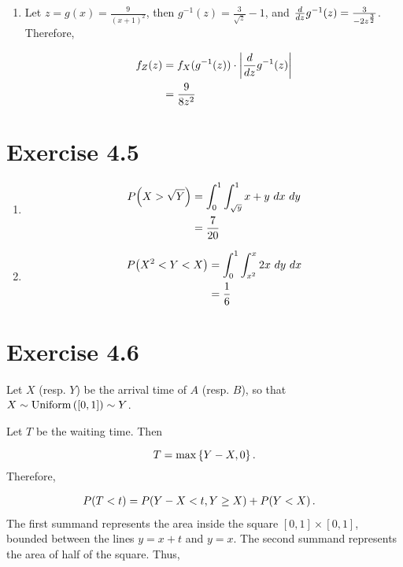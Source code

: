 \documentclass[12pt,letterpaper,reqno]{amsart}
\numberwithin{equation}{subsection}
\begin{document}
\begin{enumerate}[label=(\alph*),leftmargin=*]
    \item Let $z = g(x) = \frac{9}{(x+1)^2}$, then $g^{-1}(z) = \frac{3}{\sqrt{z}}-1$, and $\Dif{}{z} g^{-1}(z) = \frac{3}{-2 z^{\frac{3}{2}}}$. Therefore,
    
    \begin{align*}
        f_Z(z) &= f_X(g^{-1}(z)) \cdot \Abs{\Dif{}{z} g^{-1}(z)} \\
               &= \frac{9}{8z^2}
    \end{align*}
\end{enumerate}

\newpage
\section{Exercise 4.5}

\begin{enumerate}[label=(\alph*),leftmargin=*]
    \item 
    
    \begin{align*}
        \fun{P}{X > \sqrt{Y}} &= \myint{\myint{x+y}{x}{\sqrt{y}}{1}}{y}{0}{1} \\
        &= \frac{7}{20}
    \end{align*}
    
    \item
    
    \begin{align*}
        \fun{P}{X^2 < Y < X} &= \myint{\myint{2x}{y}{x^2}{x}}{x}{0}{1} \\
        &= \frac{1}{6}
    \end{align*}
\end{enumerate}

\newpage
\section{Exercise 4.6}

Let $X$ (resp. $Y$) be the arrival time of $A$ (resp. $B$), so that $X \sim \uniformdist{[0,1]} \sim Y$.

Let $T$ be the waiting time. Then

\[ T = \max \SETT{Y-X, 0}. \]
Therefore,

\begin{align*}
    \fun{P}{T < t} &= \fun{P}{Y-X < t, Y \geq X} + \fun{P}{Y < X}.
\end{align*}
The first summand represents the area inside the square $[0,1] \times [0,1]$, bounded between the lines $y = x+t$ and $y = x$. The second summand represents the area of half of the square. Thus,
\end{document}
